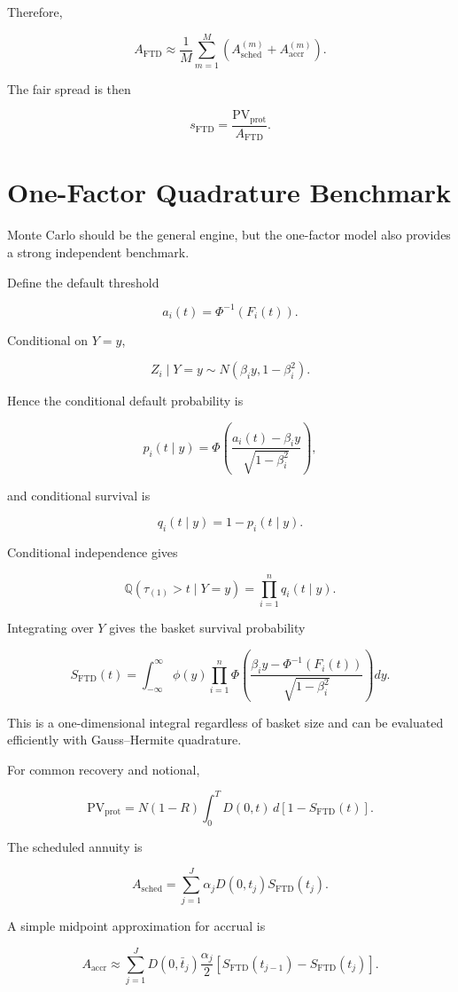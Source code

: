 \documentclass[11pt,a4paper]{article}
\newcommand{\Q}{\mathbb{Q}}
\newcommand{\FTD}{\mathrm{FTD}}
\newcommand{\PV}{\mathrm{PV}}
\begin{document}
Therefore,

\[
A_{\FTD}
\approx
\frac{1}{M}
\sum_{m=1}^{M}
\left(
A_{\mathrm{sched}}^{(m)}
+
A_{\mathrm{accr}}^{(m)}
\right).
\]

The fair spread is then

\[
s_{\FTD}
=
\frac{\PV_{\mathrm{prot}}}{A_{\FTD}}.
\]

\section{One-Factor Quadrature Benchmark}

Monte Carlo should be the general engine, but the one-factor model also provides a strong independent benchmark.

Define the default threshold

\[
a_i(t)=\Phi^{-1}(F_i(t)).
\]

Conditional on $Y=y$,

\[
Z_i\mid Y=y
\sim
N(\beta_i y,1-\beta_i^2).
\]

Hence the conditional default probability is

\[
p_i(t\mid y)
=
\Phi\left(
\frac{a_i(t)-\beta_i y}
{\sqrt{1-\beta_i^2}}
\right),
\]

and conditional survival is

\[
q_i(t\mid y)=1-p_i(t\mid y).
\]

Conditional independence gives

\[
\Q(\tau_{(1)}>t\mid Y=y)
=
\prod_{i=1}^{n}q_i(t\mid y).
\]

Integrating over $Y$ gives the basket survival probability

\[
\boxed{
S_{\FTD}(t)
=
\int_{-\infty}^{\infty}
\phi(y)
\prod_{i=1}^{n}
\Phi\left(
\frac{\beta_i y-\Phi^{-1}(F_i(t))}
{\sqrt{1-\beta_i^2}}
\right)
dy
}.
\]

This is a one-dimensional integral regardless of basket size and can be evaluated efficiently with Gauss--Hermite quadrature.

For common recovery and notional,

\[
\PV_{\mathrm{prot}}
=
N(1-R)
\int_0^T D(0,t)\,d[1-S_{\FTD}(t)].
\]

The scheduled annuity is

\[
A_{\mathrm{sched}}
=
\sum_{j=1}^{J}
\alpha_jD(0,t_j)S_{\FTD}(t_j).
\]

A simple midpoint approximation for accrual is

\[
A_{\mathrm{accr}}
\approx
\sum_{j=1}^{J}
D(0,\bar t_j)
\frac{\alpha_j}{2}
\left[
S_{\FTD}(t_{j-1})-S_{\FTD}(t_j)
\right].
\]
\end{document}
